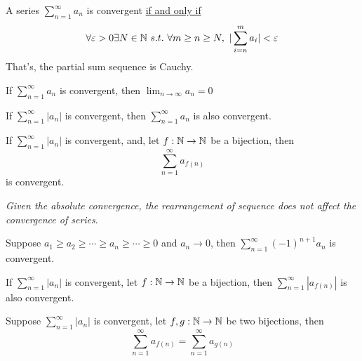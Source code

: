 \documentclass[11pt]{article}
\newcommand{\ser}[2]{\sum_{{#2}=1}^\infty {#1}_{#2}}
\begin{document}
        \begin{theorem}
            A series $\ser{a}{n}$ is convergent \ul{if and only if}
            \begin{equation}
                \forall \varepsilon > 0 \exists N \in \N\ s.t.\ \forall m \geq n \geq N,\ |\sum_{i=n}^m a_i| < \varepsilon
            \end{equation}
            That's, the partial sum sequence is Cauchy.
        \end{theorem}
        
        \begin{corollary}
            If $\ser{a}{n}$ is convergent, then $\lim_{n \to \infty} a_n = 0$
        \end{corollary}
        
        \begin{corollary}
            If $\sum_{n=1}^\infty |a_n|$ is convergent, then $\ser{a}{n}$ is also convergent.
        \end{corollary}
        
        \begin{corollary}
            If $\sum_{n=1}^\infty |a_n|$ is convergent, and, let $f: \mathbb{N} \to \mathbb{N}$ be a bijection, then 
            \begin{equation}
                \sum_{n=1}^\infty a_{f(n)}
            \end{equation}
            is convergent.
        \end{corollary}
        \emph{Given the absolute convergence, the rearrangement of sequence does not affect the convergence of series}.
        
        \begin{theorem}
            Suppose $a_1 \geq a_2 \geq \cdots \geq a_n \geq \cdots \geq 0$ and $a_n \to 0$, then $\sum_{n=1}^\infty (-1)^{n+1}a_n$ is convergent.
        \end{theorem}
        
        \begin{theorem}
            If $\sum_{n=1}^\infty |a_n|$ is convergent, let $f: \mathbb{N} \to \mathbb{N}$ be a bijection, then $\sum_{n=1}^\infty |a_{f(n)}|$ is also convergent.
        \end{theorem}
        
        \begin{theorem}
            Suppose $\sum_{n=1}^\infty |a_n|$ is convergent, let $f, g: \mathbb{N} \to \mathbb{N}$ be two bijections, then
            \begin{equation}
                \sum_{n=1}^\infty a_{f(n)} = \sum_{n=1}^\infty a_{g(n)}
            \end{equation}
        \end{theorem}
        
\end{document}
